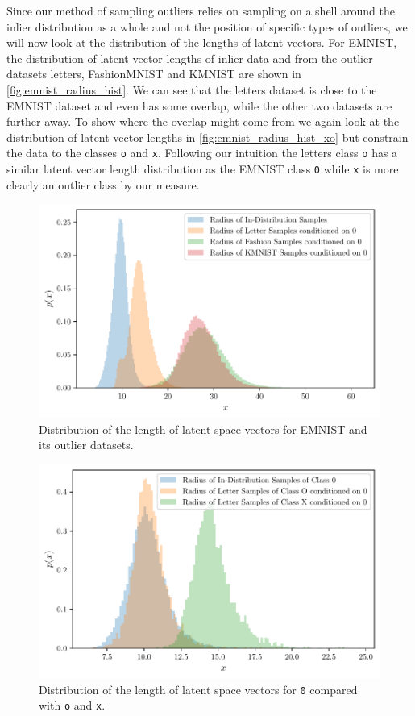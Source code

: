 Since our method of sampling outliers relies on sampling on a shell around the
inlier distribution as a whole and not the position of specific types of
outliers, we will now look at the distribution of the lengths of latent
vectors. For EMNIST, the distribution of latent vector lengths of inlier data
and from the outlier datasets letters, FashionMNIST and KMNIST are shown in
\autoref{fig:emnist_radius_hist}. We can see that the letters dataset is close
to the EMNIST dataset and even has some overlap, while the other two datasets
are further away. To show where the overlap might come from we again look at
the distribution of latent vector lengths in
\autoref{fig:emnist_radius_hist_xo} but constrain the data to the classes
\texttt{o} and \texttt{x}. Following our intuition the letters class \texttt{o}
has a similar latent vector length distribution as the EMNIST class \texttt{0}
while \texttt{x} is more clearly an outlier class by our measure.

\begin{figure}[htpb]
	\centering
	\includegraphics{figures/samples/emnist_radius_hist.pdf}
	\caption{Distribution of the length of latent space vectors for EMNIST
		and its outlier datasets.}%
	\label{fig:emnist_radius_hist}
\end{figure}

\begin{figure}[htpb]
	\centering
	\includegraphics{figures/samples/emnist_radius_hist_xo.pdf}
	\caption{Distribution of the length of latent space vectors for
		\texttt{0} compared with \texttt{o} and \texttt{x}.}%
	\label{fig:emnist_radius_hist_xo}
\end{figure}


